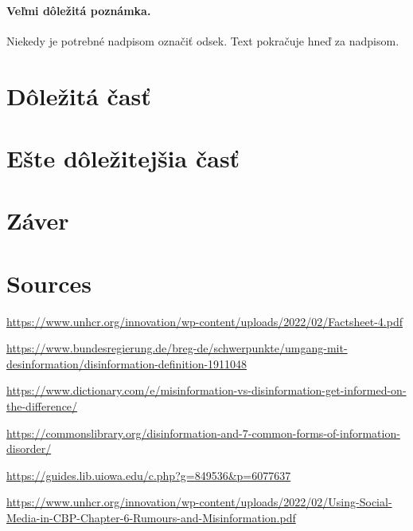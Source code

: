 \documentclass[10pt,twoside,slovak,a4paper]{article}
\begin{document}
\paragraph{Veľmi dôležitá poznámka.}
Niekedy je potrebné nadpisom označiť odsek. Text pokračuje hneď za nadpisom.



\section{Dôležitá časť} \label{dolezita}




\section{Ešte dôležitejšia časť} \label{dolezitejsia}




\section{Záver} \label{zaver} %


\section{Sources}


\url{https://www.unhcr.org/innovation/wp-content/uploads/2022/02/Factsheet-4.pdf}
\vspace{12pt}

\url{https://www.bundesregierung.de/breg-de/schwerpunkte/umgang-mit-desinformation/disinformation-definition-1911048}
\vspace{12pt}

\url{https://www.dictionary.com/e/misinformation-vs-disinformation-get-informed-on-the-difference/}
\vspace{12pt}

\url{https://commonslibrary.org/disinformation-and-7-common-forms-of-information-disorder/}
\vspace{12pt}

\url{https://guides.lib.uiowa.edu/c.php?g=849536&p=6077637}
\vspace{12pt}

\url{https://www.unhcr.org/innovation/wp-content/uploads/2022/02/Using-Social-Media-in-CBP-Chapter-6-Rumours-and-Misinformation.pdf}






\end{document}
